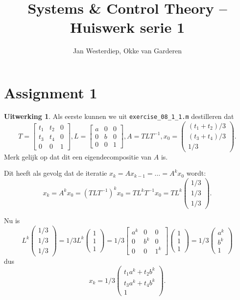 \documentclass[11pt]{amsart}
\theoremstyle{definition}
\newtheorem*{uitwerking}{Uitwerking}
\begin{document}
\title{Systems \& Control Theory -- Huiswerk serie 1}
\author{Jan Westerdiep, Okke van Garderen}
\maketitle

\section*{Assignment 1}
\begin{uitwerking}
  Als eerste kunnen we uit \texttt{exercise\_08\_1\_1.m} destilleren dat
  \[
    T = \begin{bmatrix} t_1 & t_2 & 0 \\ t_3 & t_4 & 0 \\ 0 & 0 & 1 \end{bmatrix},
    L = \begin{bmatrix} a & 0 & 0 \\ 0 & b & 0 \\ 0 & 0 & 1 \end{bmatrix},
    A = T L T^{-1}, x_0 = \begin{pmatrix} (t_1 + t_2)/3 \\ (t_3 + t_4)/3 \\ 1/3 \end{pmatrix}.
  \]
  Merk gelijk op dat dit een eigendecompositie van $A$ is.

  Dit heeft als gevolg dat de iteratie $x_k = A x_{k-1} = \ldots = A^k x_0$ wordt:
  \[
    x_k = A^k x_0 = (T L T^{-1})^k x_0 = TL^k T^{-1} x_0 = T L^k \begin{pmatrix} 1/3 \\ 1/3 \\ 1/3 \end{pmatrix}.
  \]

  Nu is
  \[
    L^k \begin{pmatrix} 1/3 \\ 1/3 \\ 1/3 \end{pmatrix} = 1/3 L^k \begin{pmatrix} 1 \\ 1 \\ 1 \end{pmatrix} = 1/3 \begin{bmatrix} a^k & 0 & 0 \\ 0 & b^k & 0 \\ 0 & 0 & 1^k \end{bmatrix}\begin{pmatrix} 1 \\ 1 \\ 1 \end{pmatrix} = 1/3 \begin{pmatrix} a^k \\ b^k \\ 1 \end{pmatrix}
  \]
  dus
  \[
    x_k = 1/3 \begin{pmatrix} t_1 a^k + t_2 b^k \\ t_3 a^k + t_4 b^k \\ 1 \end{pmatrix}.
  \]


\end{uitwerking}
\end{document}
